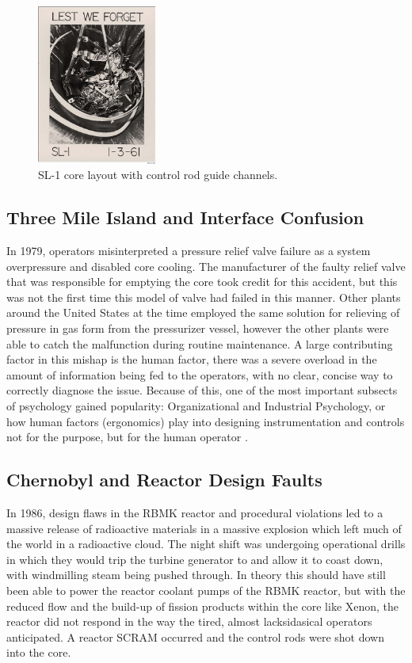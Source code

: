 \documentclass[12pt]{article}
\begin{document}
\begin{figure}[H]
    \centering
    \includegraphics[width=0.35\textwidth]{sl1diagram.jpg}
    \caption{SL-1 core layout with control rod guide channels.}
    \label{fig:sl1diagram}
\end{figure}

\subsection{Three Mile Island and Interface Confusion}
In 1979, operators misinterpreted a pressure relief valve failure as a system overpressure and disabled core cooling. The manufacturer of the faulty relief valve that was responsible for emptying the core took credit for this accident, but this was not the first time this model of valve had failed in this manner. Other plants around the United States at the time employed the same solution for relieving of pressure in gas form from the pressurizer vessel, however the other plants were able to catch the malfunction during routine maintenance. A large contributing factor in this mishap is the human factor, there was a severe overload in the amount of information being fed to the operators, with no clear, concise way to correctly diagnose the issue. Because of this, one of the most important subsects of psychology gained popularity: Organizational and Industrial Psychology, or how human factors (ergonomics) play into designing instrumentation and controls not for the purpose, but for the human operator \autocite{meshkati1991human}.

\subsection{Chernobyl and Reactor Design Faults}
In 1986, design flaws in the RBMK reactor and procedural violations led to a massive release of radioactive materials in a massive explosion which left much of the world in a radioactive cloud. The night shift was undergoing operational drills in which they would trip the turbine generator to and allow it to coast down, with windmilling steam being pushed through. In theory this should have still been able to power the reactor coolant pumps of the RBMK reactor, but with the reduced flow and the build-up of fission products within the core like Xenon, the reactor did not respond in the way the tired, almost lacksidasical operators anticipated. A reactor SCRAM occurred and the control rods were shot down into the core.
\end{document}
